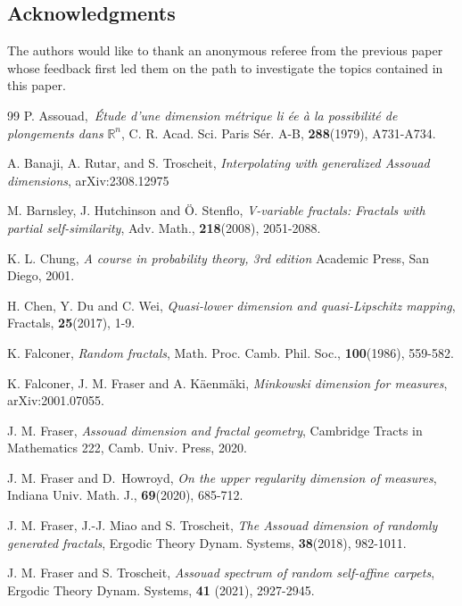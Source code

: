 \documentclass{amsart}
\theoremstyle{plain}
\numberwithin{equation}{section}
\newcommand{\R}{{\mathbb R}}
\begin{document}
\subsection*{Acknowledgments}

The authors would like to thank an anonymous referee from the previous paper \cite{HM2} whose feedback first led them on the path to investigate the topics contained in this paper.


\begin{thebibliography}{99}
 P. Assouad,\textit{\ \'{E}tude d'une dimension m\'{e}trique li%
\'{e}e \`{a} la possibilit\'{e} de plongements dans} $\R^n$, C. R. Acad. Sci.
Paris S\'{e}r. A-B, \textbf{288}(1979), A731-A734.

 A. Banaji, A. Rutar, and S. Troscheit, \textit{Interpolating with generalized Assouad dimensions},
arXiv:2308.12975


 M. Barnsley, J. Hutchinson and \"{O}. Stenflo, \textit{%
V-variable fractals: Fractals with partial self-similarity}, Adv. Math., 
\textbf{218}(2008), 2051-2088.

 K. L. Chung, \textit{A course in probability theory, 3rd
edition} Academic Press, San Diego, 2001.

 H. Chen, Y. Du and C. Wei, \textit{Quasi-lower dimension and
quasi-Lipschitz mapping}, Fractals, \textbf{25}(2017), 1-9.

 K. Falconer, \textit{Random fractals}, Math. Proc. Camb. Phil.
Soc., \textbf{100}(1986), 559-582.

 K. Falconer, J. M. Fraser and A. K\"{a}enm\"{a}ki, \textit{Minkowski dimension for
measures}, arXiv:2001.07055.

 J. M. Fraser, \textit{Assouad dimension and fractal
geometry}, Cambridge Tracts in Mathematics 222, Camb. Univ. Press, 2020.

 J. M. Fraser and D.~Howroyd, \textit{On the upper regularity
dimension of measures}, Indiana Univ. Math. J., \textbf{69}(2020), 685-712.

 J. M. Fraser, J.-J. Miao and S. Troscheit, \textit{The Assouad
dimension of randomly generated fractals}, Ergodic Theory Dynam. Systems, 
\textbf{38}(2018), 982-1011.

 J. M. Fraser and S. Troscheit, \textit{Assouad spectrum of
random self-affine carpets}, Ergodic Theory Dynam. Systems, \textbf{41}%
(2021), 2927-2945.


\end{thebibliography}
\end{document}

